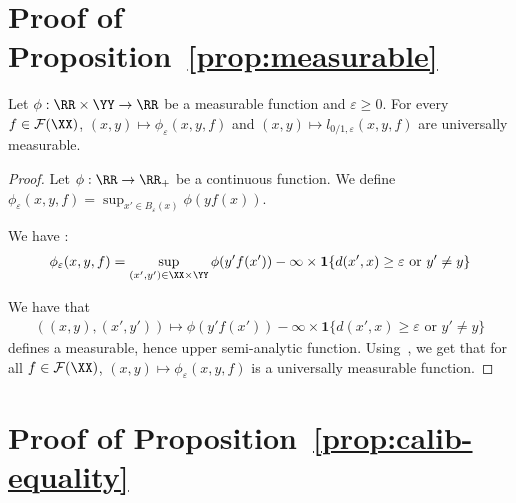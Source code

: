 \onecolumn

\section{Proof of Proposition~\ref{prop:measurable}}

\begin{prop*}
Let  $\phi:\RR\times \YY\to\RR$ be a measurable function and $\varepsilon\geq0$. For every $f\in\mathcal{F}(\XX)$, $(x,y)\mapsto \phi_\varepsilon(x,y,f)$  and $(x,y)\mapsto l_{0/1,\varepsilon}(x,y,f)$ are universally measurable.
\end{prop*}


\begin{proof}
Let $\phi:\RR\to \RR_+$ be a continuous function. We define $\phi_\varepsilon(x,y,f) = \sup_{x'\in B_\varepsilon(x)}\phi(yf(x))$. 

We have :
\begin{align*}
   \phi_\varepsilon(x,y,f) =  \sup_{(x',y')\in\XX\times\YY}\phi(y'f(x'))-\infty\times \mathbf{1}\{d(x',x)\geq \varepsilon\text{ or }y'\neq y\}
\end{align*}

We have that 
\begin{align*}
    \left((x,y),(x',y')\right)\mapsto\phi(y'f(x'))-\infty\times \mathbf{1}\{d(x',x)\geq \varepsilon\text{ or }y'\neq y\}
\end{align*}
defines a measurable, hence upper semi-analytic function. Using~\citep[Proposition 7.39, Corollary 7.42]{bertsekas2004stochastic}, we get that for all $f\in\mathcal{F}(\XX)$, $(x,y)\mapsto\phi_\varepsilon(x,y,f)$ is a universally measurable function.
\end{proof}



\section{Proof of Proposition~\ref{prop:calib-equality}}

